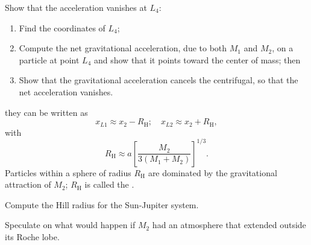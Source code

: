 \begin{exercisebox}
Show that the acceleration vanishes at $L_{4}$:
\begin{enumerate}\renewcommand{\labelenumi}{\alph{enumi})}
   \item Find the coordinates of $L_{4}$;
   \item Compute the net gravitational acceleration, due to both $M_{1}$ and $M_{2}$, on a particle at point $L_{4}$ and show that it points toward the center of mass; then
   \item Show that the gravitational acceleration cancels the centrifugal, so that the net acceleration vanishes.
\end{enumerate}
\end{exercisebox}

 they can be written
as
\[ 
	x_{L1} \approx x_{2} - R_{\mathrm{H}};\quad x_{L2}\approx x_{2} + R_{\mathrm{H}},
\]
with
\[ R_{\mathrm{H}}\approx a\left[\frac{M_{2}}{3(M_{1}+M_{2})}\right]^{1/3}. \]
Particles within a sphere of radius $R_{\mathrm{H}}$ are dominated by the gravitational attraction of $M_{2}$; $R_{\mathrm{H}}$ is called the .

\begin{exercisebox}
Compute the Hill radius for the Sun-Jupiter system.
\end{exercisebox}

\begin{exercisebox}
Speculate on what would happen if $M_{2}$ had an atmosphere that extended outside its Roche lobe.
\end{exercisebox}

